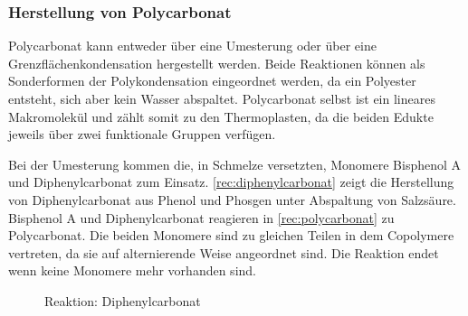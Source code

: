 \subsubsection{Herstellung von Polycarbonat}

Polycarbonat kann entweder über eine Umesterung oder über eine
Grenzflächenkondensation hergestellt werden. Beide Reaktionen können als
Sonderformen der Polykondensation eingeordnet werden, da ein Polyester entsteht,
sich aber kein Wasser abspaltet. Polycarbonat selbst ist ein lineares
Makromolekül und zählt somit zu den Thermoplasten, da die beiden Edukte
jeweils über zwei funktionale Gruppen verfügen.

Bei der Umesterung kommen die, in Schmelze versetzten, Monomere Bisphenol A und
Diphenylcarbonat zum Einsatz. \autoref{rec:diphenylcarbonat} zeigt die
Herstellung von Diphenylcarbonat aus Phenol und Phosgen unter Abspaltung von
Salzsäure. Bisphenol A und Diphenylcarbonat reagieren in
\autoref{rec:polycarbonat} zu Polycarbonat. Die beiden Monomere sind zu
gleichen Teilen in dem Copolymere vertreten, da sie auf alternierende Weise
angeordnet sind. Die Reaktion endet wenn keine Monomere mehr vorhanden
sind.

\begin{figure}[h]
    \begin{center}
        \footnotesize
        \setatomsep{1.7em}

        \chemsign{+}
        \chemrel{->}
        \chemsign{+}

        \caption{Reaktion: Diphenylcarbonat}
        \label{rec:diphenylcarbonat}
    \end{center}
\end{figure}

